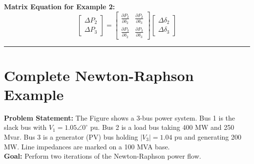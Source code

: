 \documentclass[11pt]{article}
\begin{document}
\textbf{Matrix Equation for Example 2:}
\begin{equation*}
    \begin{bmatrix} 
    \Delta P_2 \\[0.3cm]
    \Delta P_3 
    \end{bmatrix} 
    = 
    \begin{bmatrix} 
    \frac{\partial P_2}{\partial \delta_2} & \frac{\partial P_2}{\partial \delta_3} \\[0.3cm]
    \frac{\partial P_3}{\partial \delta_2} & \frac{\partial P_3}{\partial \delta_3}
    \end{bmatrix}
    \begin{bmatrix} 
    \Delta \delta_2 \\[0.3cm]
    \Delta \delta_3 
    \end{bmatrix}
\end{equation*}

\vspace{0.5cm}
\hrule
\vspace{0.5cm}





\newpage
\section*{\textcolor{mainblue}{Complete Newton-Raphson Example}}

\textbf{\textcolor{conceptgreen}{Problem Statement:}}
The Figure shows a 3-bus power system. Bus 1 is the slack bus with $V_1 = 1.05 \angle 0^\circ$ pu. Bus 2 is a load bus taking 400 MW and 250 Mvar. Bus 3 is a generator (PV) bus holding $|V_3| = 1.04$ pu and generating 200 MW. Line impedances are marked on a 100 MVA base. \\
\textbf{\textcolor{conceptgreen}{Goal:}} Perform two iterations of the Newton-Raphson power flow.
\end{document}
